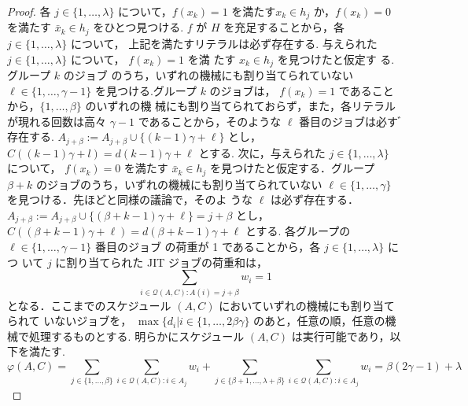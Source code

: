 \documentclass[12pt]{optlab-bachelor}
\begin{document}
\begin{proof}
  各 $j\in \{1,\ldots,\lambda\}$ について，$f(x_k)=1$ を満たす$x_k \in
  h_j$ か，$f(x_k)=0$ を満たす $\bar x_k \in h_j$ をひとつ見つける. $f$ が $H$ を充足することから，各 $j \in \{1,\ldots,\lambda\}$ について， 上記を満たすリテラルは必ず存在する.
  与えられた $j \in \{1,\ldots,\lambda \}$ について， $f(x_k) = 1$ を満
  たす $x_k \in h_j$ を見つけたと仮定す る.グループ $k$ のジョブ
  のうち，いずれの機械にも割り当てられていない $\ell \in
  \{1,\ldots,\gamma - 1\}$ を見つける.グループ $k$ のジョブは，
  $f (x_k) = 1$ であることから，$\{1,\ldots, \beta \}$ のいずれの機
  械にも割り当てられておらず，また，各リテラルが現れる回数は高々
  $\gamma − 1$ であることから，そのような $\ell$ 番目のジョブは必す
  ゙存在する. $A_{j + \beta} := A_{j + \beta} \cup \{ (k − 1) \gamma +
  \ell\}$ とし， $C((k − 1)\gamma + l) = d(k−1)\gamma + \ell$ とする.
  次に，与えられた $j \in \{1,\ldots,\lambda\}$ について， $f(x_k) = 0$
  を満たす $\bar x_k \in h_j$ を見つけたと仮定する．グループ $\beta
  + k$ のジョブのうち，いずれの機械にも割り当てられていない $\ell
  \in \{1,\ldots,\gamma\}$ を見つける．先ほどと同様の議論で，そのよ
  うな $\ell$ は必ず存在する． $A_{j + \beta} := A_{j + \beta} \cup \{
  (\beta + k − 1 ) \gamma + \ell \} = j + \beta$ とし，$C((\beta + k −
  1) \gamma + \ell) = d(\beta + k − 1)\gamma + \ell$ とする.
  各グループの $\ell \in \{1,\ldots,\gamma − 1\}$ 番目のジョブ
  の荷重が 1 であることから，各 $j \in \{1,\ldots, \lambda \}$ につ
  いて $j$ に割り当てられた JIT ジョブの荷重和は，
  $$\displaystyle \sum_{i \in \mathcal{Q}(A,C):A(i) = j + \beta}w_i =
  1$$
  となる．ここまでのスケジュール $(A, C)$ においていずれの機械にも割り当てられて
  いないジョブを， $\max\{d_i | i \in \{1,\ldots, 2\beta \gamma\}$ のあと，任意の順，任意の機械で処理するものとする.
  明らかにスケジュール $(A, C)$ は実行可能であり，以下を満たす.
  \begin{displaymath}
    \displaystyle \varphi(A,C) = \sum_{j \in
    \{1,\ldots,\beta\}} \sum_{i \in \mathcal{Q}(A,C):i \in
    A_j}w_i + \sum_{j \in
    \{\beta + 1,\ldots,\lambda + \beta\}} \sum_{i \in \mathcal{Q}(A,C):i \in
    A_j}w_i =
    \beta(2\gamma - 1) + \lambda
  \end{displaymath}
\end{proof}
\end{document}
